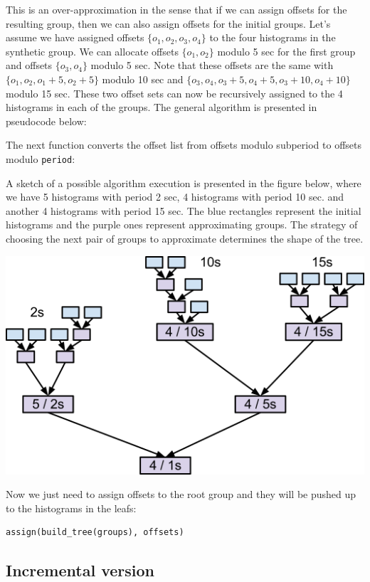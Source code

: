 This is an over-approximation in the sense that if we can assign offsets for the resulting group, then we can also assign offsets for the initial groups. Let’s assume we have assigned offsets $\{o_1,o_2,o_3,o_4\}$ to the four histograms in the synthetic group. We can allocate offsets $\{o_1, o_2\}$ modulo 5 sec for the first group and offsets $\{o_3, o_4\}$ modulo 5 sec. Note that these offsets are the same with $\{o_1, o_2, o_1 + 5, o_2 + 5\}$ modulo 10 sec and $\{o_3, o_4, o_3 + 5, o_4 + 5, o_3 + 10, o_4 + 10\}$ modulo 15 sec. These two offset sets can now be recursively assigned to the 4 histograms in each of the groups. The general algorithm is presented in pseudocode below:

The next function converts the offset list from offsets modulo subperiod to offsets modulo \verb+period+:

A sketch of a possible algorithm execution is presented in the figure below, where we have 5 histograms with period 2 sec, 4 histograms with period 10 sec. and another 4 histograms with period 15 sec. The blue rectangles represent the initial histograms and the purple ones represent approximating groups. The strategy of choosing the next pair of groups to approximate determines the shape of the tree.
\begin{center}
\includegraphics[scale=0.6]{Images/subperiod_tree.png}
\end{center}
Now we just need to assign offsets to the root group and they will be pushed up to the histograms in the leafs:
\begin{verbatim}
assign(build_tree(groups), offsets)
\end{verbatim}

\subsection*{Incremental version}


